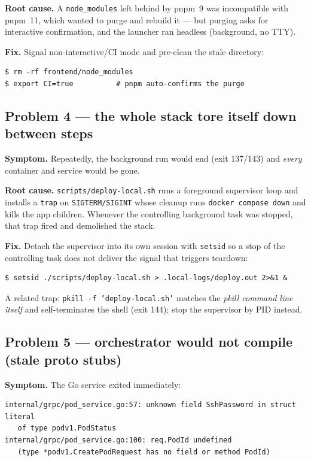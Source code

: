 \documentclass[11pt,a4paper]{article}
\newcommand{\code}[1]{\texttt{\small #1}}
\begin{document}
\textbf{Root cause.} A \code{node\_modules} left behind by pnpm~9 was
incompatible with pnpm~11, which wanted to purge and rebuild it --- but purging
asks for interactive confirmation, and the launcher ran headless (background,
no TTY).

\textbf{Fix.} Signal non-interactive/CI mode and pre-clean the stale directory:
\begin{lstlisting}
$ rm -rf frontend/node_modules
$ export CI=true          # pnpm auto-confirms the purge
\end{lstlisting}

\subsection{Problem 4 --- the whole stack tore itself down between steps}

\textbf{Symptom.} Repeatedly, the background run would end (exit 137/143) and
\emph{every} container and service would be gone.

\textbf{Root cause.} \code{scripts/deploy-local.sh} runs a foreground supervisor
loop and installs a \code{trap} on \code{SIGTERM/SIGINT} whose cleanup runs
\code{docker compose down} and kills the app children. Whenever the controlling
background task was stopped, that trap fired and demolished the stack.

\textbf{Fix.} Detach the supervisor into its own session with \code{setsid} so a
stop of the controlling task does not deliver the signal that triggers teardown:
\begin{lstlisting}
$ setsid ./scripts/deploy-local.sh > .local-logs/deploy.out 2>&1 &
\end{lstlisting}
A related trap: \code{pkill -f 'deploy-local.sh'} matches the \emph{pkill command
line itself} and self-terminates the shell (exit 144); stop the supervisor by PID
instead.

\subsection{Problem 5 --- orchestrator would not compile (stale proto stubs)}

\textbf{Symptom.} The Go service exited immediately:
\begin{lstlisting}
internal/grpc/pod_service.go:57: unknown field SshPassword in struct literal
   of type podv1.PodStatus
internal/grpc/pod_service.go:100: req.PodId undefined
   (type *podv1.CreatePodRequest has no field or method PodId)
\end{lstlisting}
\end{document}
